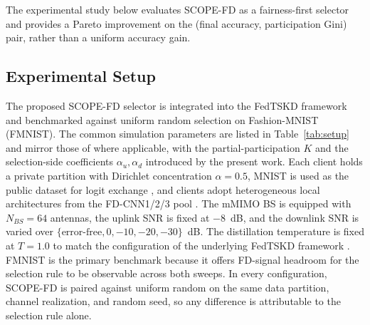 \documentclass[journal]{IEEEtran}
\begin{document}
The experimental study below evaluates SCOPE-FD as a fairness-first selector and provides a Pareto improvement on the (final accuracy, participation Gini) pair, rather than a uniform accuracy gain.

\subsection{Experimental Setup}
\label{ssec:exp-setup}

The proposed SCOPE-FD selector is integrated into the FedTSKD framework \cite{mu2024fedtskd} and benchmarked against uniform random selection on Fashion-MNIST (FMNIST). The common simulation parameters are listed in Table~\ref{tab:setup} and mirror those of \cite{mu2024fedtskd} where applicable, with the partial-participation $K$ and the selection-side coefficients $\alpha_u, \alpha_d$ introduced by the present work. Each client holds a private partition with Dirichlet concentration $\alpha = 0.5$, MNIST is used as the public dataset for logit exchange \cite{itahara2023distillation}, and clients adopt heterogeneous local architectures from the FD-CNN1/2/3 pool \cite{chan2021fedhe}. The mMIMO BS is equipped with $N_{BS} = 64$ antennas, the uplink SNR is fixed at $-8$~dB, and the downlink SNR is varied over $\{\text{error-free}, 0, -10, -20, -30\}$~dB. The distillation temperature is fixed at $T = 1.0$ to match the configuration of the underlying FedTSKD framework \cite{mu2024fedtskd}.%
FMNIST is the primary benchmark because it offers FD-signal headroom for the selection rule to be observable across both sweeps.%
In every configuration, SCOPE-FD is paired against uniform random on the same data partition, channel realization, and random seed, so any difference is attributable to the selection rule alone. %
\end{document}
